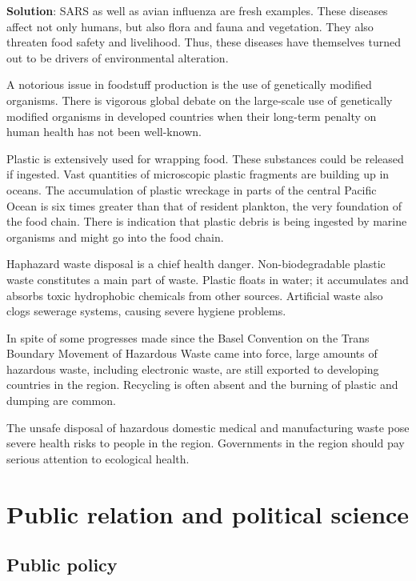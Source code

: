 \documentclass[
  openany]{book}
\newenvironment{solution}{ {\bfseries Solution}:}{}
\begin{document}
\begin{questions}
\begin{solution}
SARS as well as avian influenza are fresh examples. These diseases affect not only humans, but also flora and fauna and vegetation. They also threaten food safety and livelihood. Thus, these diseases have themselves turned out to be drivers of environmental alteration.

A notorious issue in foodstuff production is the use of genetically modified organisms. There is vigorous global debate on the large-scale use of genetically modified organisms in developed countries when their long-term penalty on human health has not been well-known.

Plastic is extensively used for wrapping food. These substances could be released if ingested. Vast quantities of microscopic plastic fragments are building up in oceans. The accumulation of plastic wreckage in parts of the central Pacific Ocean is six times greater than that of resident plankton, the very foundation of the food chain. There is indication that plastic debris is being ingested by marine organisms and might go into the food chain.

Haphazard waste disposal is a chief health danger. Non-biodegradable plastic waste constitutes a main part of waste. Plastic floats in water; it accumulates and absorbs toxic hydrophobic chemicals from other sources. Artificial waste also clogs sewerage systems, causing severe hygiene problems.

In spite of some progresses made since the Basel Convention on the Trans Boundary Movement of Hazardous Waste came into force, large amounts of hazardous waste, including electronic waste, are still exported to developing countries in the region. Recycling is often absent and the burning of plastic and dumping are common.

The unsafe disposal of hazardous domestic medical and manufacturing waste pose severe health risks to people in the region. Governments in the region should pay serious attention to ecological health.

\end{solution}

\end{questions}

\hypertarget{public-relation-and-political-science}{%
\chapter{Public relation and political science}\label{public-relation-and-political-science}}

\hypertarget{public-policy}{%
\section{Public policy}\label{public-policy}}
\end{document}
